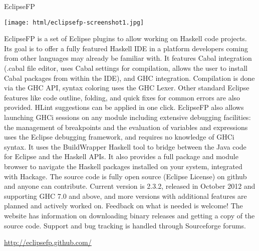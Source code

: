 \begin{hcarentry}[updated]{EclipseFP}
\makeheader

\begin{center}
\texttt{[image: html/eclipsefp-screenshot1.jpg]}
\end{center}

EclipseFP is a set of Eclipse plugins to allow working on Haskell code projects. Its goal is to offer a fully featured Haskell IDE in a platform developers coming from other languages may already be familiar with.
It features Cabal integration (.cabal file editor, uses Cabal settings for compilation, allows the user to install Cabal packages from within the IDE), and GHC integration. Compilation is done via the GHC API, syntax coloring uses the GHC Lexer. Other standard Eclipse features like code outline, folding, and quick fixes for common errors are also provided. HLint suggestions can be applied in one click. EclipseFP also allows launching GHCi sessions on any module including extensive debugging facilities: the management of breakpoints and the evaluation of variables and expressions uses the Eclipse debugging framework, and requires no knowledge of GHCi syntax. It uses the BuildWrapper Haskell tool to bridge between the Java code for Eclipse and the Haskell APIs. It also provides a full package and module browser to navigate the Haskell packages installed on your system, integrated with Hackage.
The source code is fully open source (Eclipse License) on github and anyone can contribute. Current version is 2.3.2, released in October 2012 and supporting GHC 7.0 and above, and more versions with additional features are planned and actively worked on. Feedback on what is needed is welcome! The website has information on downloading binary releases and getting a copy of the source code. Support and bug tracking is handled through Sourceforge forums.

\FurtherReading 
\url{http://eclipsefp.github.com/}
\end{hcarentry}
